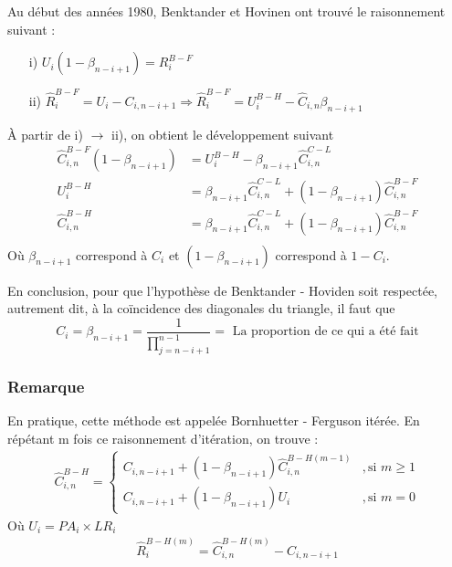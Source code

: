Au début des années 1980, Benktander et Hovinen ont trouvé le raisonnement suivant :
\begin{itemize}
\item[i)] $U_i (1 - \beta_{n-i+1}) = R_i^{B-F}$
\item[ii)] $\widehat{R}_i^{B-F} = U_i - C_{i,n-i+1} \Rightarrow \widehat{R}_i^{B-F} = U_i^{B-H} - \widehat{C}_{i,n}\beta_{n-i+1}$
\end{itemize}
À partir de i) $\rightarrow$ ii), on obtient le développement suivant
\begin{align*}
\widehat{C}_{i, n}^{B-F} ( 1 - \beta_{n-i+1} )  &= U_i ^{B-H} - \beta_{n-i+1} \widehat{C}_{i, n}^{C-L} \\
U_i ^{B-H} &= \beta_{n-i+1} \widehat{C}_{i, n}^{C-L} + ( 1 - \beta_{n-i+1} )\widehat{C}_{i, n}^{B-F}  \\
\widehat{C}_{i,n}^{B-H} &= \beta_{n-i+1} \widehat{C}_{i, n}^{C-L} + ( 1 - \beta_{n-i+1} )\widehat{C}_{i, n}^{B-F}  \\
\end{align*}
Où $\beta_{n-i+1}$ correspond à $C_i$ et $( 1 - \beta_{n-i+1} )$ correspond à $ 1 - C_i$.
\newline

En conclusion, pour que l'hypothèse de Benktander - Hoviden soit respectée, autrement dit, à la coïncidence  des diagonales du triangle,  il faut que 
\begin{equation}
C_i = \beta_{n-i+1} = \frac{1}{\prod_{j=n-i+1}^{n-1}} = \text{ La proportion de ce qui a été fait}
\end{equation}

\subsubsection*{Remarque}
En pratique, cette méthode est appelée Bornhuetter - Ferguson itérée. \newline
En répétant  m fois ce raisonnement d'itération, on trouve :
\begin{align*}
 \widehat{C}_{i,n}^{B-H} =
     	\left\{
     	\begin{array}{rl}
     	C_{i,n-i+1} + ( 1 - \beta_{n-i+1} )\widehat{C}_{i, n}^{B-H (m-1)} &, \text{si } m \geq 1 \\
		  C_{i,n-i+1} + ( 1 - \beta_{n-i+1} )U_i &, \text{si } m = 0
     	\end{array}
     	\right.
\end{align*}
Où $U_i = PA_i \times LR_i$
\begin{align*}
\widehat{R}_i^{B-H(m)} = \widehat{C}_{i, n}^{B-H (m)} - C_{i,n-i+1}
\end{align*}
